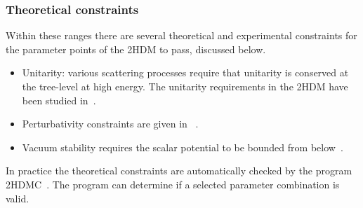 \subsubsection{Theoretical constraints}
Within these ranges there are several theoretical and experimental constraints for the parameter points of the 2HDM to pass, discussed below.	
\begin{itemize}
	\item Unitarity: various scattering processes  require that unitarity is conserved at the tree-level at high energy.
    The unitarity requirements in the 2HDM have been studied in~\cite{Kanemura1993LeeQuiggThacker, Akeroyd2000TreeLevel, arhrib2000unitarity}.
\item Perturbativity constraints are given in ~\cite{Kanemura1993LeeQuiggThacker,Branco_2HDMreview2011}.
	
	\item Vacuum stability requires the scalar potential to be bounded from below~\cite{Gunion2003decouple}.%
	
\end{itemize}
In practice the theoretical constraints are automatically checked by the program 2HDMC~\cite{Eriksson20102HDMC}.
The program can determine if a selected parameter combination is valid.

